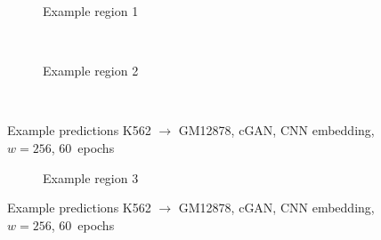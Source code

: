\begin{figure}[p] %
    \begin{subfigure}{\textwidth}
        \centering
        \caption{Example  region 1} \label{fig:appendix:GAN256_K-on-G_r1}
    \end{subfigure}\\[3mm]
    \begin{subfigure}{\textwidth}
        \centering
        \caption{Example region 2} \label{fig:appendix:GAN256_K-on-Gr2}
    \end{subfigure}\\[3mm]
    \caption{Example predictions K562 $\rightarrow$ GM12878, cGAN, CNN embedding, $w=256$, 60~epochs} 
\end{figure}
\begin{figure}\ContinuedFloat
    \begin{subfigure}{\textwidth}
        \centering
        \caption{Example region 3} \label{fig:appendix:GAN256_K-on-G_r3}
    \end{subfigure}
    \caption{Example predictions K562 $\rightarrow$ GM12878, cGAN, CNN embedding, $w=256$, 60~epochs} 
     \label{fig:appendix:GAN256_K-on-G_matrices}
\end{figure}
\clearpage
